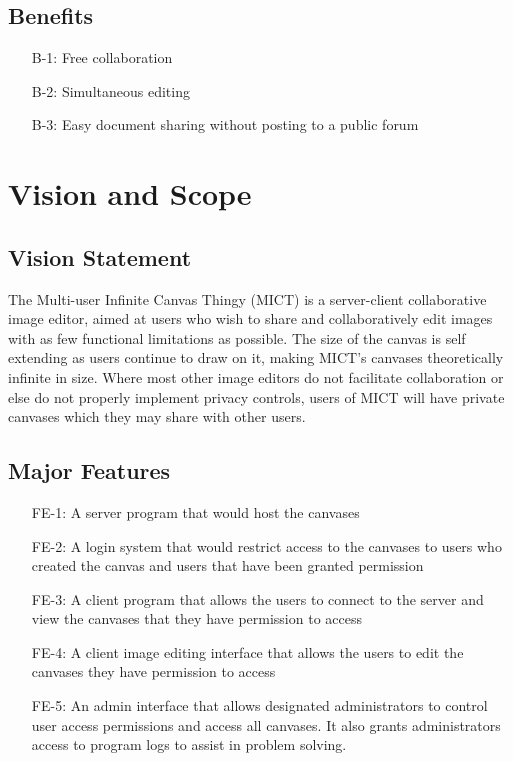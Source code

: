 \documentclass[11pt,oneside,a4paper]{article}
\begin{document}
\subsection{Benefits}
\begin{itemize}
\item[B-1:] Free collaboration
\item[B-2:] Simultaneous editing
\item[B-3:] Easy document sharing without posting to a public forum
\end{itemize}

\section{Vision and Scope}
\subsection{Vision Statement}
The Multi-user Infinite Canvas Thingy (MICT) is a server-client collaborative image editor, aimed at users who wish to share and collaboratively edit images with as few functional limitations as possible.
The size of the canvas is self extending as users continue to draw on it, making MICT's canvases theoretically infinite in size.
Where most other image editors do not facilitate collaboration or else do not properly implement privacy controls, users of MICT will have private canvases which they may share with other users.
\subsection{Major Features}
\begin{itemize}
\item[FE-1:] A server program that would host the canvases
\item[FE-2:] A login system that would restrict access to the canvases to users who created the canvas and users that have been granted permission
\item[FE-3:] A client program that allows the users to connect to the server and view the canvases that they have permission to access
\item[FE-4:] A client image editing interface that allows the users to edit the canvases they have permission to access
\item[FE-5:] An admin interface that allows designated administrators to control user access permissions and access all canvases. It also grants administrators access to program logs to assist in problem solving.
\end{itemize}
\end{document}
